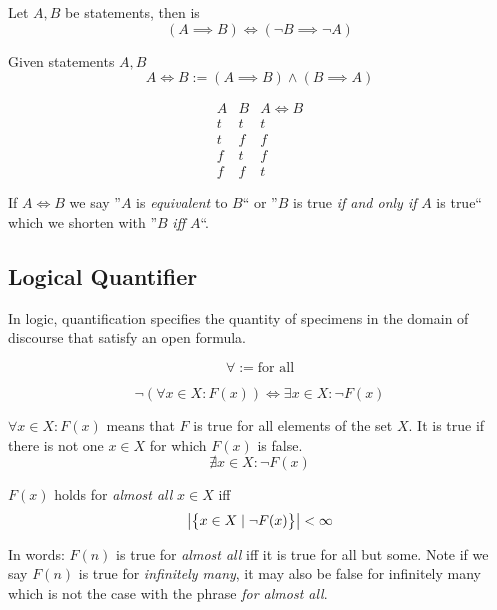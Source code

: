\begin{proposition}[Contraposition]
   Let \(A, B\) be statements, then is
   \[(A \implies B) \iff (\neg B \implies \neg A)\]
\end{proposition}

\begin{definition}
   Given statements \(A, B\)
   \[A \iff B := (A \implies B) \land (B \implies A)\]

   \[\begin{array}{c|c||c}
         A & B & A \iff B \\
         \hline
         t & t & t \\
         t & f & f \\
         f & t & f \\
         f & f & t
   \end{array}\]
\end{definition}
\begin{remark}
   If \(A \iff B\) we say ''\(A\) is \textit{equivalent} to \(B\)`` or ''\(B\) is true \textit{if and only if} \(A\) is true`` which we shorten with ''\(B\) \textit{iff} \(A\)``.
\end{remark}

\subsection{Logical Quantifier}
In logic, quantification specifies the quantity of specimens in the domain of discourse that satisfy an open formula.

\begin{definition}
   \[\forall := \text{for all}\]
\end{definition}
\begin{remark}
   \[\neg(\forall x \in X: F(x)) \iff \exists x \in X: \neg F(x)\]
\end{remark}
\begin{example}
   \(\forall x \in X: F(x)\) means that \(F\) is true for all elements of the set \(X\).
   It is true if there is not one \(x \in X\) for which \(F(x)\) is false.
   \[\nexists x \in X: \neg F(x)\]
\end{example}

\begin{definition}
   \(F(x)\) holds for \emph{almost all} \(x \in X\) iff
   \[\left\lvert\big\{x \in X \mid \neg F(x)\big\}\right\rvert < \infty\]
\end{definition}
\begin{remark}
   In words: \(F(n)\) is true for \emph{almost all} iff it is true for all but some.
   Note if we say \(F(n)\) is true for \emph{infinitely many}, it may also be false for infinitely many which is not the case with the phrase \emph{for almost all}.
\end{remark}

